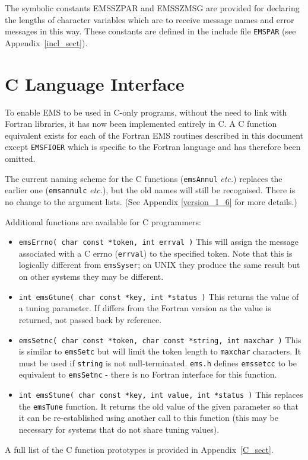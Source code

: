 \documentclass[twoside,11pt]{article}
\newcommand{\htmlref}[2]{#1}
\newcommand{\latex}[1]{#1}
\newcommand{\xlabel}[1]{}
\renewcommand{\_}{\texttt{\symbol{95}}}
\begin{document}
The symbolic constants EMS\_\_SZPAR and EMS\_\_SZMSG are provided for declaring
the lengths of character variables which are to receive message names and 
error messages in this way.
These constants are defined in the include file 
\htmlref{\texttt{EMS\_PAR}}{incl_sect}\latex{ (see
Appendix~\ref{incl_sect})}.

\section{\xlabel{c_language_interface}C Language Interface}
\label{C_lang}
To enable EMS to be used in C-only programs, without the need to link with
Fortran libraries, it has now been implemented entirely
in C. A C function equivalent exists for each of the Fortran EMS routines
described in this document except \texttt{EMS\_FIOER} which is specific to the
Fortran language and has therefore been omitted.

The current naming scheme for the C functions (\texttt{emsAnnul}
\textit{etc.}) replaces the earlier one (\texttt{ems\_annul\_c} \textit{etc.}),
but the old names will still be recognised. 
There is no change to the argument lists.
(See Appendix \ref{version_1_6} for more details.)

Additional functions are available for C programmers:
\begin{itemize}

\item \texttt{emsErrno( char const *token, int errval )}
This will assign the message associated
with a C errno (\texttt{errval}) to the specified token. Note that this is
logically different from \texttt{emsSyser}; on UNIX they produce the same
result but on other systems they may be different.

\item \texttt{int emsGtune( char const *key, int *status )}
This returns the value of a tuning parameter. If differs from the Fortran
version as the value is returned, not passed back by reference.

\item \texttt{emsSetnc( char const *token, char const *string, int maxchar )} 
This is similar to \texttt{emsSetc} but will limit the token length to
\texttt{maxchar} characters.
It must be used if \texttt{string} is not null-terminated.
\texttt{ems.h} defines \texttt{ems\_setc\_c} to be equivalent to
\texttt{emsSetnc} - there is no Fortran interface for this function.

\item \texttt{int emsStune( char const *key, int value, int *status )}
This replaces the \texttt{emsTune} function. It returns the old value of
the given parameter so that it can be re-established using another call
to this function (this may be necessary for systems that do not share
tuning values).


\end{itemize} 
A full list of the C function prototypes is provided in Appendix~\ref{C_sect}.
\end{document}

